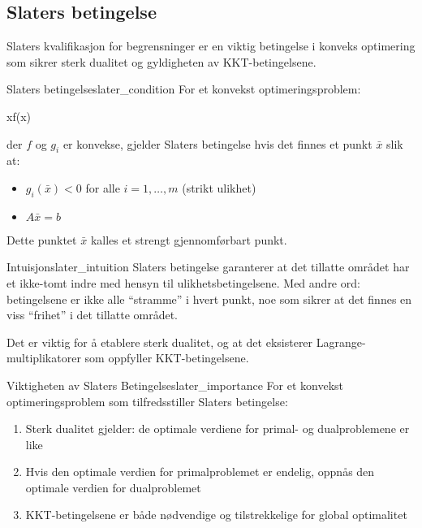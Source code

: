 \subsection{Slaters betingelse}
\label{sec:slater_condition}

Slaters kvalifikasjon for begrensninger er en viktig betingelse i konveks optimering som sikrer sterk dualitet og gyldigheten av KKT-betingelsene.

\begin{definition}{Slaters betingelse}{slater_condition}
	For et konvekst optimeringsproblem:
	\begin{mini*}
		{x}{f(x)}{}{}
	\end{mini*}
	der \( f \) og \( g_i \) er konvekse, gjelder Slaters betingelse hvis det finnes et punkt \( \bar{x} \) slik at:
	\begin{itemize}
		\item \( g_i(\bar{x}) < 0 \) for alle \( i = 1, \ldots, m \) (strikt ulikhet)
		\item \( A\bar{x} = b \)
	\end{itemize}
	Dette punktet \( \bar{x} \) kalles et strengt gjennomførbart punkt.
\end{definition}

\begin{remark}{Intuisjon}{slater_intuition}
	Slaters betingelse garanterer at det tillatte området har et ikke-tomt indre med hensyn til ulikhetsbetingelsene.
	Med andre ord: betingelsene er ikke alle \enquote{stramme} i hvert punkt, noe som sikrer at det finnes en viss \enquote{frihet} i det tillatte området.

	Det er viktig for å etablere sterk dualitet, og at det eksisterer Lagrange-multiplikatorer som oppfyller KKT-betingelsene.
\end{remark}

\begin{theorem}{Viktigheten av Slaters Betingelse}{slater_importance}
	For et konvekst optimeringsproblem som tilfredsstiller Slaters betingelse:
	\begin{enumerate}
		\item Sterk dualitet gjelder: de optimale verdiene for primal- og dualproblemene er like
		\item Hvis den optimale verdien for primalproblemet er endelig, oppnås den optimale verdien for dualproblemet
		\item KKT-betingelsene er både nødvendige og tilstrekkelige for global optimalitet
	\end{enumerate}
\end{theorem}

